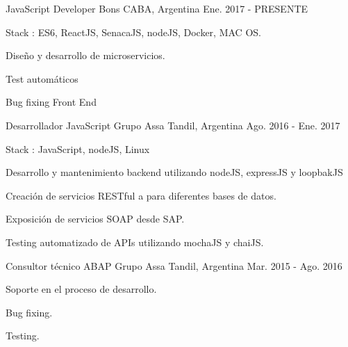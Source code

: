 \begin{cventries}
\cventry
{JavaScript Developer} %
{Bons} %
{CABA, Argentina} %
{Ene. 2017 - PRESENTE} %
{ %
\begin{cvitems}
\item {Stack : ES6, ReactJS, SenacaJS, nodeJS, Docker, MAC OS.}
\item {Diseño y desarrollo de microservicios.}
\item {Test automáticos}
\item {Bug fixing Front End}
\end{cvitems}
}
\cventry
{Desarrollador JavaScript} %
{Grupo Assa} %
{Tandil, Argentina} %
{Ago. 2016 - Ene. 2017} %
{ %
\begin{cvitems}
\item {Stack : JavaScript, nodeJS, Linux}
\item {Desarrollo y mantenimiento backend utilizando nodeJS, expressJS y loopbakJS}
\item {Creación de servicios RESTful a para diferentes bases de datos.}
\item {Exposición de servicios SOAP desde SAP.}
\item {Testing automatizado de APIs utilizando mochaJS y chaiJS.}
\end{cvitems}
}
\cventry
{Consultor técnico ABAP} %
{Grupo Assa} %
{Tandil, Argentina} %
{Mar. 2015 - Ago. 2016} %
{ %
\begin{cvitems}
\item {Soporte en el proceso de desarrollo.}
\item {Bug fixing.}
\item {Testing.}
\end{cvitems}
}
\end{cventries}
